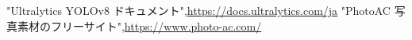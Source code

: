 

\renewcommand{\bibname}{参考文献}
\begin{thebibliography}{99}
"Ultralytics YOLOv8 ドキュメント",\url{https://docs.ultralytics.com/ja}
 "PhotoAC 写真素材のフリーサイト",\url{https://www.photo-ac.com/}

 \end{thebibliography}
 
